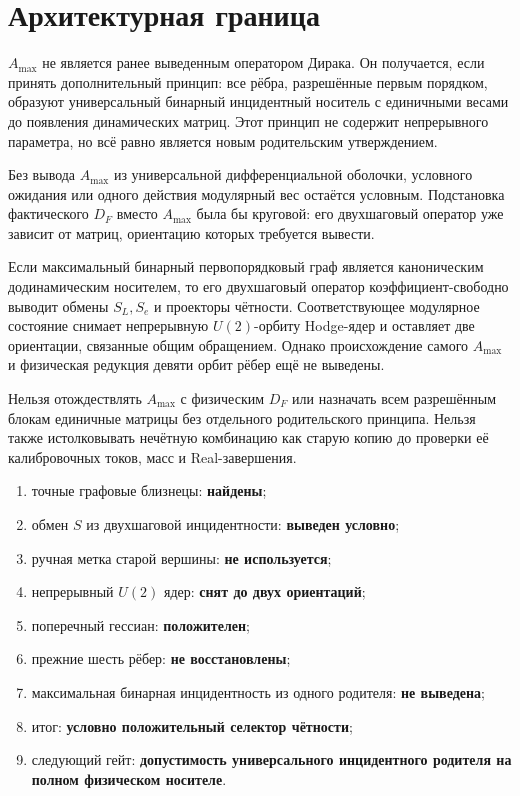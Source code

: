 \section{Архитектурная граница}

$A_{\max}$ не является ранее выведенным оператором Дирака. Он получается,
если принять дополнительный принцип: все рёбра, разрешённые первым порядком,
образуют универсальный бинарный инцидентный носитель с единичными весами до
появления динамических матриц. Этот принцип не содержит непрерывного
параметра, но всё равно является новым родительским утверждением.

Без вывода $A_{\max}$ из универсальной дифференциальной оболочки,
условного ожидания или одного действия модулярный вес остаётся условным.
Подстановка фактического $D_F$ вместо $A_{\max}$ была бы круговой: его
двухшаговый оператор уже зависит от матриц, ориентацию которых требуется
вывести.

\begin{theorem}
Если максимальный бинарный первопорядковый граф является каноническим
додинамическим носителем, то его двухшаговый оператор коэффициент-свободно
выводит обмены $S_L,S_e$ и проекторы чётности. Соответствующее модулярное
состояние снимает непрерывную $U(2)$-орбиту Hodge-ядер и оставляет две
ориентации, связанные общим обращением. Однако происхождение самого
$A_{\max}$ и физическая редукция девяти орбит рёбер ещё не выведены.
\end{theorem}

\begin{nogocriterion}
Нельзя отождествлять $A_{\max}$ с физическим $D_F$ или назначать всем
разрешённым блокам единичные матрицы без отдельного родительского принципа.
Нельзя также истолковывать нечётную комбинацию как старую копию до проверки
её калибровочных токов, масс и Real-завершения.
\end{nogocriterion}

\begin{protocol}
\begin{enumerate}
 \item точные графовые близнецы: \textbf{найдены};
 \item обмен $S$ из двухшаговой инцидентности: \textbf{выведен условно};
 \item ручная метка старой вершины: \textbf{не используется};
 \item непрерывный $U(2)$ ядер: \textbf{снят до двух ориентаций};
 \item поперечный гессиан: \textbf{положителен};
 \item прежние шесть рёбер: \textbf{не восстановлены};
 \item максимальная бинарная инцидентность из одного родителя:
 \textbf{не выведена};
 \item итог: \textbf{условно положительный селектор чётности};
 \item следующий гейт: \textbf{допустимость универсального инцидентного
 родителя на полном физическом носителе}.
\end{enumerate}
\end{protocol}

